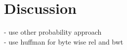 
\chapter{Discussion}
\label{ch:Discussion}

- use other probability approach\\
- use huffman for byte wise rel and bwt\\


